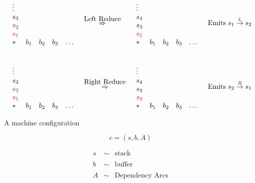 {$$\begin{array}{llll}
    \begin{array}{lllll}
      \vdots \\
      s_3 \\
    {\color{red} s_2} \\
    {\color{red} s_1} \\
    * & b_1 & b_2 & b_3 & \ldots
  \end{array}
  &
  \stackrel{\mbox{Left Reduce}}{\Rightarrow}
  &
  \begin{array}{lllll}
    \vdots \\
    s_4 \\
    s_3 \\
    {\color{red} s_1} \\
    * & b_1 & b_2 & b_3 & \ldots
  \end{array}
  &
  \mbox{Emits} \;s_1 \stackrel{{\color{red} L}}{\rightarrow} s_2 \\
  \\
  \\
    \begin{array}{lllll}
      \vdots \\
      s_3 \\
    {\color{red} s_2} \\
    {\color{red} s_1} \\
    * & b_1 & b_2 & b_3 & \ldots
  \end{array}
  &
  \stackrel{\mbox{Right Reduce}}{\Rightarrow}
  &
  \begin{array}{lllll}
    \vdots \\
    s_4 \\
    s_3 \\
    {\color{red} s_2} \\
    * & b_1 & b_2 & b_3 & \ldots
  \end{array}
  &
  \mbox{Emits} \;s_2 \stackrel{{\color{red} R}}{\rightarrow} s_1 \\
\end{array}
$$


A machine configuration

$$c = (s,b,A)$$

\begin{eqnarray*}
  s & \sim & \mbox{stack} \\
  \\
  b & \sim & \mbox{buffer} \\
  \\
  A & \sim & \mbox{Dependency Arcs}
\end{eqnarray*}

}
